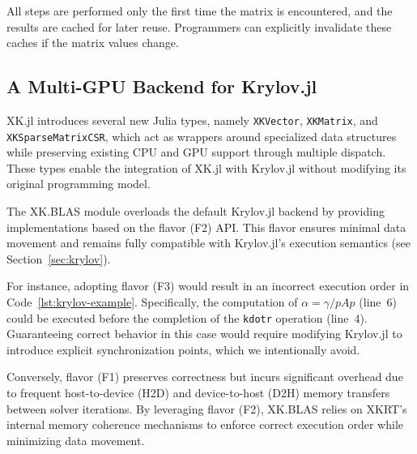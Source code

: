 \documentclass{juliacon}
\newcommand{\todo}[1]{\textcolor{red}{\textbf{TODO:} #1}}
\begin{document}
All steps are performed only the first time the matrix is encountered, and the results are cached for later reuse.
Programmers can explicitly invalidate these caches if the matrix values change.

\subsection{A Multi-GPU Backend for Krylov.jl}

XK.jl introduces several new Julia types, namely \texttt{XKVector}, \texttt{XKMatrix}, and \texttt{XKSparseMatrixCSR}, which act as wrappers around specialized data structures while preserving existing CPU and GPU support through multiple dispatch.  
These types enable the integration of XK.jl with Krylov.jl without modifying its original programming model.

The XK.BLAS module overloads the default Krylov.jl backend by providing implementations based on the flavor (F2) API.  
This flavor ensures minimal data movement and remains fully compatible with Krylov.jl’s execution semantics (see Section~\ref{sec:krylov}).

For instance, adopting flavor (F3) would result in an incorrect execution order in Code~\ref{lst:krylov-example}.  
Specifically, the computation of $\alpha = \gamma / pAp$ (line~6) could be executed before the completion of the \texttt{kdotr} operation (line~4).  
Guaranteeing correct behavior in this case would require modifying Krylov.jl to introduce explicit synchronization points, which we intentionally avoid.

Conversely, flavor (F1) preserves correctness but incurs significant overhead due to frequent host-to-device (H2D) and device-to-host (D2H) memory transfers between solver iterations.  
By leveraging flavor (F2), XK.BLAS relies on XKRT’s internal memory coherence mechanisms to enforce correct execution order while minimizing data movement.


\end{document}
